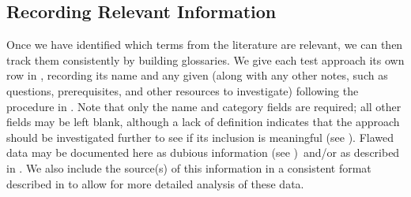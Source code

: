 \ifnotpaper\newpage\fi
\subsection{Recording Relevant Information}\label{record-info}


Once we have identified which terms from the literature are relevant, we can
then track them consistently by building glossaries.
We give each test approach its own row in \ourApproachGlossary{}, recording its
name and any given \approachFields*{} (along with any other notes, such as
questions, prerequisites, and other resources to investigate) following the
procedure in .
Note that only the name and category fields are required; all other fields
may be left blank, although a lack of definition indicates that the approach
should be investigated further to see if its inclusion is meaningful (see
). Flawed data may be documented here as dubious information
(see )\ifnotpaper\ and/or as described in \fi.
We also include the source(s) of this information in a consistent format
\ifnotpaper described in  \fi to allow for more
detailed analysis of these data.


